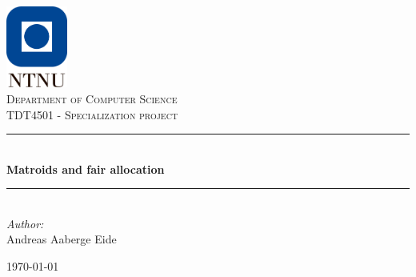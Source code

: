\documentclass[b5paper]{report}
\begin{document}
\begin{titlepage}
  \newcommand{\HRule}{\rule{\linewidth}{0.5mm}}

  \vbox{ }
  \vbox{ }
  \begin{center}
    \includegraphics[width=0.15\textwidth]{ntnu.png}\\[1cm]
    \textsc{\Large Department of Computer Science}\\[1.5cm]
    \textsc{\large TDT4501 - Specialization project}\\[0.5cm]
    \vbox{ }

    \HRule \\[0.4cm]
    { \huge \bfseries Matroids and fair allocation}\\[0.4cm]
    \HRule \\[1.5cm]

    \large
    \emph{Author:}\\
    Andreas Aaberge Eide
    \vfill

    {\large \today\par}
  \end{center}
\end{titlepage}






\printskelnotes{}


\end{document}
